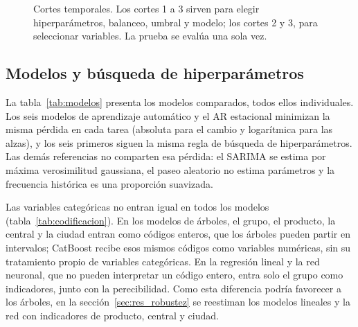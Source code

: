 \begin{figure}[htbp]\centering
{}
\caption{Cortes temporales. Los cortes 1 a 3 sirven para elegir hiperparámetros, balanceo, umbral y modelo; los cortes 2 y 3, para seleccionar variables. La prueba se evalúa una sola vez.}\label{fig:cortes}
\end{figure}

\subsection{Modelos y búsqueda de hiperparámetros}
\label{sec:ajuste}

La tabla~\ref{tab:modelos} presenta los modelos comparados, todos ellos individuales. Los seis modelos de aprendizaje automático y el AR estacional minimizan la misma pérdida en cada tarea (absoluta para el cambio y logarítmica para las alzas), y los seis primeros siguen la misma regla de búsqueda de hiperparámetros. Las demás referencias no comparten esa pérdida: el SARIMA se estima por máxima verosimilitud gaussiana, el paseo aleatorio no estima parámetros y la frecuencia histórica es una proporción suavizada.

Las variables categóricas no entran igual en todos los modelos (tabla~\ref{tab:codificacion}). En los modelos de árboles, el grupo, el producto, la central y la ciudad entran como códigos enteros, que los árboles pueden partir en intervalos; CatBoost recibe esos mismos códigos como variables numéricas, sin su tratamiento propio de variables categóricas. En la regresión lineal y la red neuronal, que no pueden interpretar un código entero, entra solo el grupo como indicadores, junto con la perecibilidad. Como esta diferencia podría favorecer a los árboles, en la sección~\ref{sec:res_robustez} se reestiman los modelos lineales y la red con indicadores de producto, central y ciudad.

